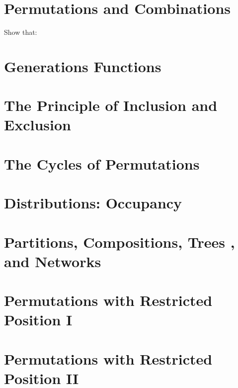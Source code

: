 \documentclass[10pt,a4paper]{book}
\begin{document}
\newenvironment{enunciation}{}{}

\chapter{Permutations and Combinations}
%
%
%

Show that:


%

\chapter{Generations Functions}

\chapter{The Principle of Inclusion and Exclusion}

\chapter{The Cycles of Permutations}

\chapter{Distributions: Occupancy}

\chapter{Partitions, Compositions, Trees , and Networks}

\chapter{Permutations with Restricted Position I}

\chapter{Permutations with Restricted Position II}
\end{document}
